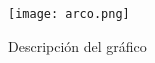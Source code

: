 \documentclass{article}
\begin{document}
\begin{figure}
    \centering
    \texttt{[image: arco.png]}
    \caption{Descripción del gráfico}
\end{figure}
\end{document}
